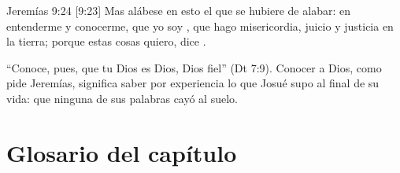 \begin{verso}{Jeremías 9:24 [9:23]}
Mas alábese en esto el que se hubiere de alabar: en entenderme y conocerme, que yo soy \SENOR{}, que hago misericordia, juicio y justicia en la tierra; porque estas cosas quiero, dice \SENOR{}.
\end{verso}

``Conoce, pues, que \SENOR{} tu Dios es Dios, Dios fiel'' (Dt 7:9). Conocer a Dios, como pide Jeremías, significa saber por experiencia lo que Josué supo al final de su vida: que ninguna de sus palabras cayó al suelo.

\section*{Glosario del capítulo}
